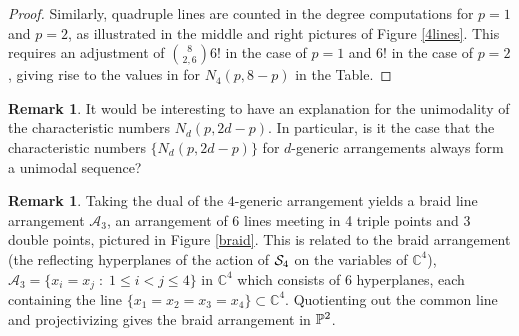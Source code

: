 \documentclass[12pt]{article}
\theoremstyle{plain}
\theoremstyle{definition}
\newtheorem{remark}[theorem]{Remark}
\newcommand{\A}{\mathcal{A}}
\newcommand{\C}{\mathbb{C}}
\renewcommand{\P}{\ensuremath \mathbb{P}}
\renewcommand{\S}{\ensuremath \mathcal{S}}
\begin{document}
\begin{proof}
Similarly, quadruple lines are counted in the degree
computations for $p=1$ and $p=2$, as illustrated in the middle and
right pictures of Figure \ref{4lines}. This requires an adjustment of
$\binom{8}{2,6}6!$ in the case of $p=1$ and $6!$ in the case of
$p=2$, giving rise to the values in for $N_4(p,8-p)$ in the Table. 
\end{proof} 

\begin{remark} It would be interesting to have an explanation for the unimodality of
the characteristic numbers $N_d(p,2d-p)$. In
particular, is it the case that the characteristic numbers
$\{ N_d(p,2d-p)\}$ for
$d$-generic arrangements always form a unimodal sequence? 
\end{remark}

\begin{remark} \label{braidr}
Taking the dual of the $4$-generic arrangement yields a braid line
arrangement $\mathcal{A}_3$, an arrangement of $6$ lines meeting in 4 triple points
and 3 double points, pictured in Figure \ref{braid}. This is related
to the braid arrangement (the reflecting hyperplanes of the
action of $\S_4$ on the variables of $\C^4$), $\A_3 = \{x_i = x_j \; : \; 1 \leq i
< j \leq 4\}$ in $\C^4$ which consists of 6 hyperplanes, each
containing the line $\{x_1=x_2=x_3=x_4\} \subset \C^4$. Quotienting
out the common line and projectivizing gives the braid arrangement in $\P^2$. 



\end{remark}
\end{document}
